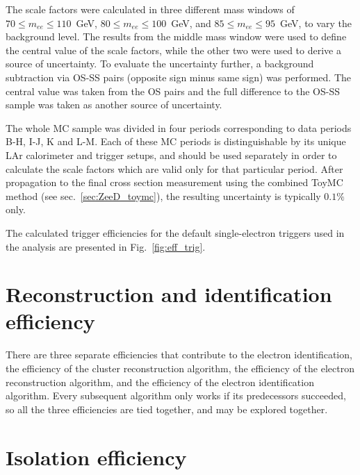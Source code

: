 The scale factors were calculated in three different mass windows of $70 \le m_{ee} \le 110$~GeV, $80 \le m_{ee} \le 100$~GeV, and $85 \le m_{ee} \le 95$~GeV, to vary the background level. The results from the middle mass window were used to define the central value of the scale factors, while the other two were used to derive a source of uncertainty. To evaluate the uncertainty further, a background subtraction via OS-SS pairs (opposite sign minus same sign) was performed. The central value was taken from the OS pairs and the full difference to the OS-SS sample was taken as another source of uncertainty.

The whole MC sample was divided in four periods corresponding to data periods B-H, I-J, K and L-M. Each of these MC periods is distinguishable by its unique LAr calorimeter and trigger setups, and should be used separately in order to calculate the scale factors which are valid only for that particular period. After propagation to the final cross section measurement using the combined ToyMC method (see sec.~\ref{sec:ZeeD_toymc}), the resulting uncertainty is typically $0.1\%$ only.

The calculated trigger efficiencies for the default single-electron triggers used in the analysis are presented in Fig.~\ref{fig:eff_trig}.

\begin{figure}
\end{figure}

\section{Reconstruction and identification efficiency}

There are three separate efficiencies that contribute to the electron identification, the efficiency of the cluster reconstruction algorithm, the efficiency of the electron reconstruction algorithm, and the efficiency of the electron identification algorithm. Every subsequent algorithm only works if its predecessors succeeded, so all the three efficiencies are tied together, and may be explored together.

\section{Isolation efficiency}
